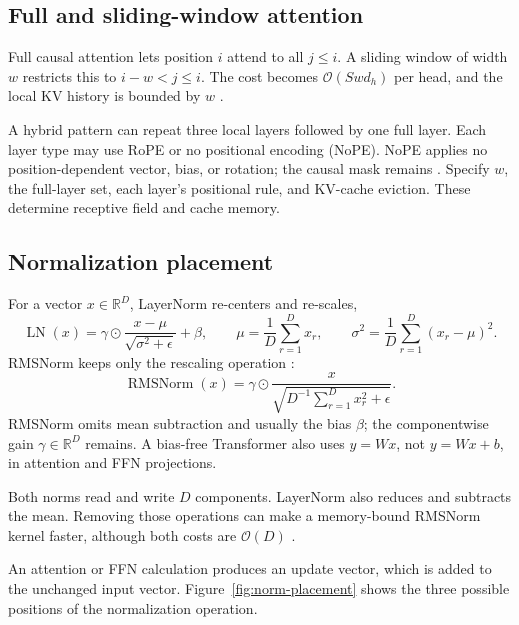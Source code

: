 \documentclass[11pt]{article}
\newcommand{\R}{\mathbb{R}}
\newcommand{\RMSNorm}{\operatorname{RMSNorm}}
\newcommand{\LN}{\operatorname{LN}}
\begin{document}
\subsection{Full and sliding-window attention}

Full causal attention lets position $i$ attend to all $j\le i$.  A sliding window of
width $w$ restricts this to $i-w<j\le i$.  The cost becomes
$\mathcal{O}(Swd_h)$ per head, and the local KV history is bounded by $w$
\citep{beltagy2020longformer}.

A hybrid pattern can repeat three local layers followed by one full layer.  Each
layer type may use RoPE or no positional encoding (NoPE).  NoPE applies no
position-dependent vector, bias, or rotation; the causal mask remains
\citep{hashimoto2026architecture}.  Specify $w$, the full-layer set, each layer's
positional rule, and KV-cache eviction.  These determine receptive field and cache
memory.

\subsection{Normalization placement}

For a vector $x\in\R^D$, LayerNorm re-centers and re-scales,
\begin{equation}
  \LN(x)
  = \gamma\odot\frac{x-\mu}{\sqrt{\sigma^2+\epsilon}}+\beta,
  \qquad
  \mu=\frac{1}{D}\sum_{r=1}^{D}x_r,
  \qquad
  \sigma^2=\frac{1}{D}\sum_{r=1}^{D}(x_r-\mu)^2.
\end{equation}
RMSNorm keeps only the rescaling operation \citep{zhang2019rmsnorm}:
\begin{equation}
  \RMSNorm(x)
  = \gamma\odot
    \frac{x}{\sqrt{D^{-1}\sum_{r=1}^{D}x_r^2+\epsilon}}.
\end{equation}
RMSNorm omits mean subtraction and usually the bias $\beta$; the componentwise
gain $\gamma\in\R^D$ remains.  A bias-free Transformer also uses $y=Wx$, not
$y=Wx+b$, in attention and FFN projections.

Both norms read and write $D$ components.  LayerNorm also reduces and subtracts
the mean.  Removing those operations can make a memory-bound RMSNorm kernel faster,
although both costs are $\mathcal{O}(D)$ \citep{hashimoto2026architecture}.

An attention or FFN calculation produces an update vector, which is added to
the unchanged input vector.  Figure~\ref{fig:norm-placement} shows the three
possible positions of the normalization operation.
\end{document}
